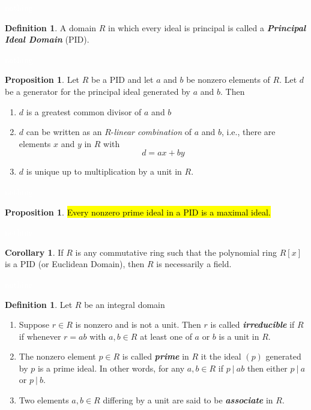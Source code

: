 \documentclass{article}
\theoremstyle{definition}
\newtheorem{prop}[thm]{Proposition}
\newtheorem{cor}[thm]{Corollary}
\newtheorem{defn}[thm]{Definition}
\newcommand{\nl}{\textcolor{white}{nothing}}
\begin{document}
\nl

\begin{defn}
A domain $R$ in which every ideal is principal is called a \textbf{\textit{Principal Ideal Domain}} (PID).
\end{defn}

\nl

\begin{prop}
Let $R$ be a PID and let $a$ and $b$ be nonzero elements of $R$. Let $d$ be a generator for the principal ideal generated by $a$ and $b$. Then
\begin{enumerate}
\item $d$ is a greatest common divisor of $a$ and $b$
\item $d$ can be written as an $R$-\textit{linear combination} of $a$ and $b$, i.e., there are elements $x$ and $y$ in $R$ with 
\[d = ax + by\]
\item $d$ is unique up to multiplication by a unit in $R$.
\end{enumerate}
\end{prop}

\nl

\begin{prop}
\hl{Every nonzero prime ideal in a PID is a maximal ideal.} 
\end{prop}

\nl

\begin{cor}
If $R$ is any commutative ring such that the polynomial ring $R[x]$ is a PID (or Euclidean Domain), then $R$ is necessarily a field.
\end{cor}

\nl

\begin{defn}
Let $R$ be an integral domain
\begin{enumerate}
\item Suppose $r\in R$ is nonzero and is not a unit. Then $r$ is called \textit{\textbf{irreducible}} if $R$ if whenever $r = ab$ with $a,b\in R$ at least one of $a$ or $b$ is a unit in $R$.
\item The nonzero element $p\in R$ is called \textbf{\textit{prime}} in $R$ it the ideal $(p)$ generated by $p$ is a prime ideal. In other words, for any $a,b\in R$ if $p\ |\ ab$ then either $p\ |\ a$ or $p\ |\ b$.
\item Two elements $a,b\in R$ differing by a unit are said to be \textit{\textbf{associate}} in $R$.
\end{enumerate}
\end{defn}
\end{document}

